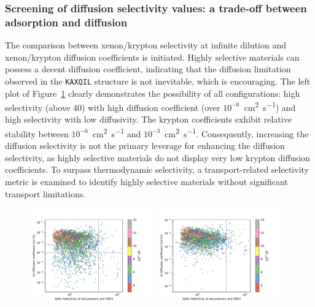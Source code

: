 \documentclass[main]{subfiles}
\begin{document}
\subsubsection{Screening of diffusion selectivity values: a trade-off between adsorption and diffusion}\label{sct:diff_screen}

The comparison between xenon/krypton selectivity at infinite dilution and xenon/krypton diffusion coefficients is initiated. Highly selective materials can possess a decent diffusion coefficient, indicating that the diffusion limitation observed in the \texttt{KAXQIL} structure is not inevitable, which is encouraging. The left plot of Figure~\ref{fgr:diff_s0_lcd} clearly demonstrates the possibility of all configurations: high selectivity (above $40$) with high diffusion coefficient (over $10^{-6}$~\si{\square\cm\per\s}) and high selectivity with low diffusivity. The krypton coefficients exhibit relative stability between $10^{-6}$~\si{\square\cm\per\s} and $10^{-3}$~\si{\square\cm\per\s}. Consequently, increasing the diffusion selectivity is not the primary leverage for enhancing the diffusion selectivity, as highly selective materials do not display very low krypton diffusion coefficients. To surpass thermodynamic selectivity, a transport-related selectivity metric is examined to identify highly selective materials without significant transport limitations.

\begin{figure}[ht]
  \centering
    \includegraphics[width=0.48\textwidth]{figures/5-diffusion/D_xe-s0-lcd.pdf}
    \includegraphics[width=0.48\textwidth]{figures/5-diffusion/D_kr-s0-lcd.pdf}
    \caption{}\label{fgr:diff_s0_lcd}
\end{figure}
\end{document}
